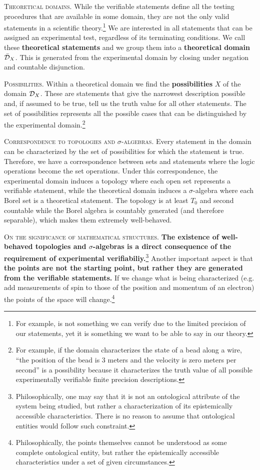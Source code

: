 \documentclass[10pt,twocolumn, nofootinbib]{revtex4-2}
\newcommand\partitle[1]{\textsc{#1}.}
\begin{document}
\partitle{Theoretical domains} While the verifiable statements define all the testing procedures that are available in some domain, they are not the only valid statements in a scientific theory.\footnote{For example,  is not something we can verify due to the limited precision of our statements, yet it is something we want to be able to say in our theory.} We are interested in all statements that can be assigned an experimental test, regardless of its terminating conditions. We call these \textbf{theoretical statements} and we group them into a \textbf{theoretical domain} $\bar{\mathcal{D}}_X$. This is generated from the experimental domain by closing under negation and countable disjunction.

\partitle{Possibilities} Within a theoretical domain we find the \textbf{possibilities} $X$ of the domain $\mathcal{D}_X$. These are statements that give the narrowest description possible and, if assumed to be true, tell us the truth value for all other statements. The set of possibilities represents all the possible cases that can be distinguished by the experimental domain.\footnote{For example, if the domain characterizes the state of a bead along a wire, ``the position of the bead is 3 meters and the velocity is zero meters per second'' is a possibility because it characterizes the truth value of all possible experimentally verifiable finite precision descriptions.}

\partitle{Correspondence to topologies and $\sigma$-algebras} Every statement in the domain can be characterized by the set of possibilities for which the statement is true. Therefore, we have a correspondence between sets and statements where the logic operations become the set operations. Under this correspondence, the experimental domain induces a topology where each open set represents a verifiable statement, while the theoretical domain induces a $\sigma$-algebra where each Borel set is a theoretical statement. The topology is at least $T_0$ and second countable while the Borel algebra is countably generated (and therefore separable), which makes them extremely well-behaved.

\partitle{On the significance of mathematical structures} \textbf{The existence of well-behaved topologies and $\sigma$-algebras is a direct consequence of the requirement of experimental verifiabiliy.}\footnote{Philosophically, one may say that it is not an ontological attribute of the system being studied, but rather a characterization of its epistemically accessible characteristics. There is no reason to assume that ontological entities would follow such constraint.} Another important aspect is that \textbf{the points are not the starting point, but rather they are generated from the verifiable statements.} If we change what is being characterized (e.g. add measurements of spin to those of the position and momentum of an electron) the points of the space will change.\footnote{Philosophically, the points themselves cannot be understood as some complete ontological entity, but rather the epistemically accessible characteristics under a set of given circumstances.}
\end{document}
